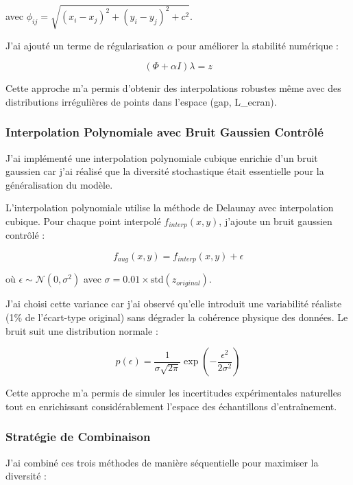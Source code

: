 \documentclass[10pt,twocolumn]{article}
\begin{document}
avec $\phi_{ij} = \sqrt{(x_i-x_j)^2 + (y_i-y_j)^2 + c^2}$.

J'ai ajouté un terme de régularisation $\alpha$ pour améliorer la stabilité numérique :

\begin{equation}
(\Phi + \alpha I)\lambda = z
\end{equation}

Cette approche m'a permis d'obtenir des interpolations robustes même avec des distributions irrégulières de points dans l'espace (gap, L\_ecran).

\subsubsection{Interpolation Polynomiale avec Bruit Gaussien Contrôlé}

J'ai implémenté une interpolation polynomiale cubique enrichie d'un bruit gaussien car j'ai réalisé que la diversité stochastique était essentielle pour la généralisation du modèle.

L'interpolation polynomiale utilise la méthode de Delaunay avec interpolation cubique. Pour chaque point interpolé $f_{interp}(x,y)$, j'ajoute un bruit gaussien contrôlé :

\begin{equation}
f_{aug}(x,y) = f_{interp}(x,y) + \epsilon
\end{equation}

où $\epsilon \sim \mathcal{N}(0, \sigma^2)$ avec $\sigma = 0.01 \times \text{std}(z_{original})$.

J'ai choisi cette variance car j'ai observé qu'elle introduit une variabilité réaliste (1\% de l'écart-type original) sans dégrader la cohérence physique des données. Le bruit suit une distribution normale :

\begin{equation}
p(\epsilon) = \frac{1}{\sigma\sqrt{2\pi}} \exp\left(-\frac{\epsilon^2}{2\sigma^2}\right)
\end{equation}

Cette approche m'a permis de simuler les incertitudes expérimentales naturelles tout en enrichissant considérablement l'espace des échantillons d'entraînement.

\subsubsection{Stratégie de Combinaison}

J'ai combiné ces trois méthodes de manière séquentielle pour maximiser la diversité :
\end{document}
